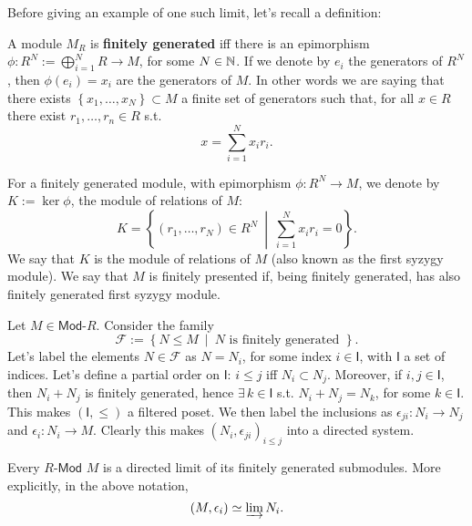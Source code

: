 Before giving an example of one such limit, let's recall a definition:
\begin{defn}
	A module $M_R$ is \textbf{finitely generated} iff there is an epimorphism
	$\phi: R^N := \bigoplus_{i=1}^N R \to M$, for some $N \in \mathbb{N}$.
	If we denote by $e_i$ the generators of $R^N$, then $\phi(e_i) = x_i$ are the generators of $M$.
	In other words we are saying that there exists
	$\left\{ x_1, \ldots, x_N \right\} \subset M$ a finite set of generators 
	such that, for all $x \in R$ there exist $r_1, \ldots, r_n \in R$ s.t.
	\begin{equation}
	x = \sum_{i=1}^{N} x_i r_i
	.\end{equation} 
\end{defn}

\begin{defn}
	For a finitely generated module, with epimorphism $\phi: R^N \to M$,
	we denote by $K := \ker \phi$, the module of relations of $M$:
	\begin{equation}
	K = 
	\left\{ \left( r_1, \ldots, r_N \right) \in R^N \ \middle|\ \sum_{i=1}^{N} x_i r_i = 0 \right\}
	.\end{equation} 
	We say that $K$ is the module of relations of $M$ (also known as the first syzygy module).
	We say that $M$ is finitely presented if, being finitely generated, has also finitely generated first syzygy module.
\end{defn}

\begin{ex}
	Let $M \in \mathsf{Mod}\text{-}R$.
	Consider the family
	\begin{equation}
	\mathcal{F} := \left\{ N \leq M \ \middle|\ 
	N \text{ is finitely generated } \right\}
	.\end{equation} 
	Let's label the elements $N \in \mathcal{F}$ as $N= N_i$, for some index $i \in \mathsf{I}$, with $\mathsf{I}$ a set of indices.
	Let's define a partial order on $\mathsf{I}$:
	$i \leq j$ iff $N_i \subset N_j$.
	Moreover, if $i, j \in \mathsf{I}$, then $N_i + N_j$ is finitely generated, hence $\exists\, k \in \mathsf{I}$ s.t.
	$N_i + N_j = N_k$, for some $k \in \mathsf{I}$.
	This makes $\left( \mathsf{I}, \leq \right)$ a filtered poset.
	We then label the inclusions as $\epsilon_{ji}: N_i \to N_j$ and $\epsilon_i: N_i \to M$.
	Clearly this makes $\left(N_i, \epsilon_{ji}\right)_{i \leq j}$ into a directed system.
\end{ex} 

\begin{prop}
	Every $R\text{-}\mathsf{Mod}$ $M$ is a directed limit of its finitely generated submodules.
	More explicitly, in the above notation,
	\begin{equation}
	\left(M, \epsilon_i\right) \simeq \varinjlim N_i
	.\end{equation} 
\end{prop} 

